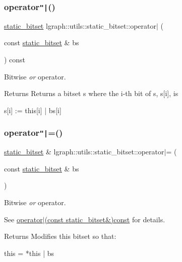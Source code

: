 \subsubsection{\texorpdfstring{operator\texttt{"|}()}{operator|()}}
{\footnotesize\ttfamily \hyperlink{classlgraph_1_1utils_1_1static__bitset}{static\+\_\+bitset} lgraph\+::utils\+::static\+\_\+bitset\+::operator$\vert$ (\begin{DoxyParamCaption}\item[{const \hyperlink{classlgraph_1_1utils_1_1static__bitset}{static\+\_\+bitset} \&}]{bs }\end{DoxyParamCaption}) const}



Bitwise {\itshape or} operator. 

\begin{DoxyReturn}{Returns}
Returns a bitset s where the i-\/th bit of s, s\mbox{[}i\mbox{]}, is \begin{DoxyVerb}s[i] := this[i] | bs[i]\end{DoxyVerb}
 
\end{DoxyReturn}
\mbox{\label{classlgraph_1_1utils_1_1static__bitset_a62330084392296754cfc5e525d99cab2}} 
\subsubsection{\texorpdfstring{operator\texttt{"|}=()}{operator|=()}}
{\footnotesize\ttfamily \hyperlink{classlgraph_1_1utils_1_1static__bitset}{static\+\_\+bitset} \& lgraph\+::utils\+::static\+\_\+bitset\+::operator$\vert$= (\begin{DoxyParamCaption}\item[{const \hyperlink{classlgraph_1_1utils_1_1static__bitset}{static\+\_\+bitset} \&}]{bs }\end{DoxyParamCaption})}



Bitwise {\itshape or} operator. 

See \hyperlink{classlgraph_1_1utils_1_1static__bitset_a8b0ee09d74157739ac96995b6a07b29f}{operator$\vert$(const static\+\_\+bitset\&)const} for details. \begin{DoxyReturn}{Returns}
Modifies this bitset so that\+: \begin{DoxyVerb}this = *this | bs\end{DoxyVerb}
 
\end{DoxyReturn}
\mbox{\label{classlgraph_1_1utils_1_1static__bitset_a8bb49442a841f4a899f355fb278a9468}} 
